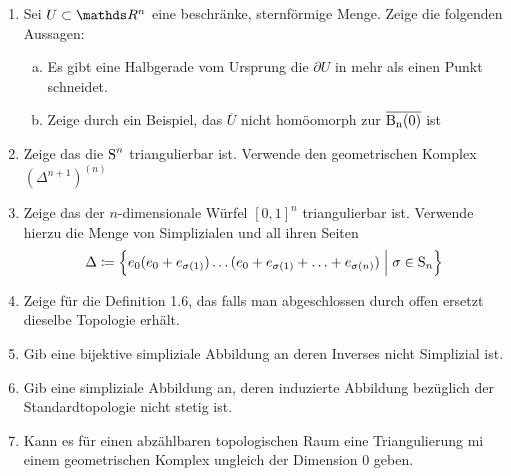\documentclass[ngerman]{scrartcl}
\begin{document}
\begin{Beh}
  \begin{enumerate}[(1)]
    \item Sei $U \subset \R^n$ eine beschränke, sternförmige Menge. Zeige 
      die folgenden Aussagen:
      \begin{enumerate}[a)]
        \item Es gibt eine Halbgerade vom Ursprung die $\partial U$ in mehr
          als einen Punkt schneidet.
        \item Zeige durch ein Beispiel, das $\overline{U}$ nicht homöomorph zur
          $\operatorname{\overline{\operatorname{B}_{n}(0)}}$ ist
      \end{enumerate}
    \item Zeige das die $\operatorname{S}^n$ triangulierbar ist. Verwende den
      geometrischen Komplex $(\Delta^{n+1})^{(n)}$
    \item Zeige das der $n$-dimensionale Würfel $[0,1]^n$
      triangulierbar ist.  Verwende hierzu die Menge von Simplizialen
      und all ihren Seiten
      \begin{gather*}
        \Delta \coloneqq \left\{  e_0 (e_0 + e_{\sigma(1)}) \ldots (e_0 +
          e_{\sigma(1)} + \ldots + e_{\sigma(n)})  \; \Big| \;  \sigma \in \operatorname{S}_n \right\}
      \end{gather*}
    \item Zeige für die Definition 1.6, das falls man abgeschlossen
      durch offen ersetzt dieselbe Topologie erhält.
    \item Gib eine bijektive simpliziale Abbildung an deren Inverses
      nicht Simplizial ist.
    \item Gib eine simpliziale Abbildung an, deren induzierte
      Abbildung bezüglich der Standardtopologie nicht stetig ist.
    \item Kann es für einen abzählbaren topologischen Raum eine
      Triangulierung mi einem geometrischen Komplex ungleich der
      Dimension $0$ geben.
    \end{enumerate}
\end{Beh}

\end{document}
